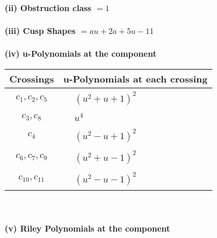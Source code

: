 \documentclass[1p]{elsarticle_modified}
\theoremstyle{definition}
\begin{document}
\flushleft \textbf{(ii) Obstruction class $= 1$}\\~\\
\flushleft \textbf{(iii) Cusp Shapes $= a u+2 a+5 u-11$}\\~\\
\newpage\renewcommand{\arraystretch}{1}
\flushleft \textbf{(iv) u-Polynomials at the component}\newline \\
\begin{tabular}{m{50pt}|m{274pt}}
Crossings & \hspace{64pt}u-Polynomials at each crossing \\
\hline $$\begin{aligned}c_{1},c_{2},c_{5}\end{aligned}$$&$\begin{aligned}
&(u^2+u+1)^2
\end{aligned}$\\
\hline $$\begin{aligned}c_{3},c_{8}\end{aligned}$$&$\begin{aligned}
&u^4
\end{aligned}$\\
\hline $$\begin{aligned}c_{4}\end{aligned}$$&$\begin{aligned}
&(u^2- u+1)^2
\end{aligned}$\\
\hline $$\begin{aligned}c_{6},c_{7},c_{9}\end{aligned}$$&$\begin{aligned}
&(u^2+u-1)^2
\end{aligned}$\\
\hline $$\begin{aligned}c_{10},c_{11}\end{aligned}$$&$\begin{aligned}
&(u^2- u-1)^2
\end{aligned}$\\
\hline
\end{tabular}\\~\\
\newpage\renewcommand{\arraystretch}{1}
\flushleft \textbf{(v) Riley Polynomials at the component}\newline \\
\end{document}

